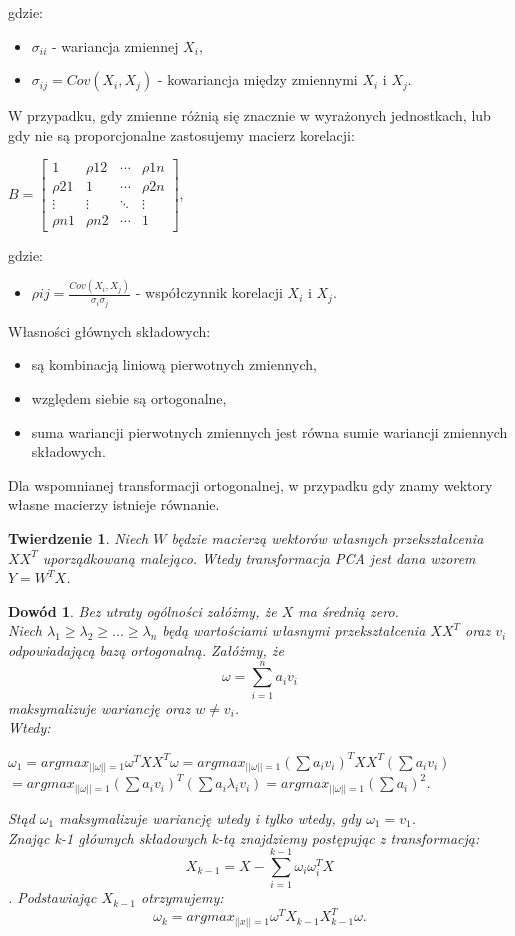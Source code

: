 \documentclass[12pt,a4paper]{report}
\newtheorem{tw}{Twierdzenie}
\newtheorem{dw}{Dowód}
\begin{document}
gdzie:
\begin{itemize}
\item $\sigma_{ii}$ - wariancja zmiennej $X_i$,
\item $\sigma_{ij}=Cov(X_i,X_j)$ - kowariancja między zmiennymi $X_i$ i $X_j$.
\end{itemize}
W przypadku, gdy zmienne różnią się znacznie w wyrażonych jednostkach, lub gdy nie są proporcjonalne zastosujemy macierz korelacji:
\begin{center}
$ B= \left[
        \begin{array}{cccc}
         1 & \rho{12} & \cdots & \rho{1n}\\
         \rho{21} & 1 & \cdots & \rho{2n}\\
         \vdots & \vdots & \ddots & \vdots\\
         \rho{n1} & \rho{n2} & \cdots & 1
         \end{array}
      \right]$, 
\end{center}
gdzie:
\begin{itemize}
\item $\rho{ij}=\frac{Cov(X_i,X_j)}{\sigma_{i}\sigma_{j}}$ - współczynnik korelacji $X_i$ i $X_j$.
\end{itemize}
\bigskip
\bigskip
Własności głównych składowych:
\begin{itemize}
\item są kombinacją liniową pierwotnych zmiennych,
\item względem siebie są ortogonalne,
\item suma wariancji pierwotnych zmiennych jest równa sumie wariancji zmiennych składowych.
\end{itemize}
\bigskip
\bigskip
Dla wspomnianej transformacji ortogonalnej, w przypadku gdy znamy wektory własne macierzy istnieje równanie.
\begin{tw}
Niech $W$ będzie macierzą wektorów własnych przekształcenia $XX^T$ uporządkowaną malejąco.
Wtedy transformacja PCA jest dana wzorem $Y=W^T X$.
\end{tw}
\begin{dw}
Bez utraty ogólności załóżmy, że $X$ ma średnią zero.
\\Niech $\lambda_1\geq\lambda_2\geq...\geq\lambda_n$ będą wartościami własnymi przekształcenia $XX^T$ oraz $v_i$ odpowiadającą bazą ortogonalną. Załóżmy, że $$\omega = \sum_{i=1}^n a_iv_i$$ maksymalizuje wariancję oraz $w\neq v_i$.
\\Wtedy:
\begin{center}
$\omega_1 = argmax_{||\omega||=1}\omega^TXX^T\omega = argmax_{||\omega||=1}(\sum a_iv_i)^TXX^T(\sum a_iv_i)$
\\$ = argmax_{||\omega||=1}(\sum a_iv_i)^T(\sum a_i\lambda_iv_i)= argmax_{||\omega||=1}(\sum a_i)^2$.
\end{center}
Stąd $\omega_1$ maksymalizuje wariancję wtedy i tylko wtedy, gdy $\omega_1=v_1$. 
\\Znając k-1 głównych składowych k-tą znajdziemy postępując z transformacją:
$$X_{k-1} = X - \sum_{i=1}^{k-1}\omega_i\omega_i^TX$$.
Podstawiając $X_{k-1}$ otrzymujemy:
$$\omega_k = argmax_{||x||=1}\omega^TX_{k-1}X_{k-1}^T\omega.$$
\end{dw}
\end{document}
